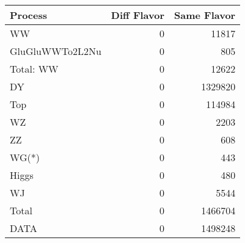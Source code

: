 \begin{table}[ht]
	\centering
\begin{tabular}{lrr}

         Process &  Diff Flavor &  Same Flavor \\
		\hline
              WW &            0 &        11817 \\
 GluGluWWTo2L2Nu &            0 &          805 \\
\hline
       Total: WW &            0 &        12622 \\
              DY &            0 &      1329820 \\
             Top &            0 &       114984 \\
              WZ &            0 &         2203 \\
              ZZ &            0 &          608 \\
           WG(*) &            0 &          443 \\
           Higgs &            0 &          480 \\
              WJ &            0 &         5544 \\
\hline
           Total &            0 &      1466704 \\
            DATA &            0 &      1498248 \\


\end{tabular}

\end{table}